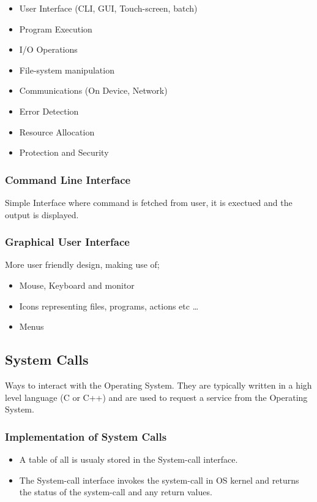 \documentclass[]{article}
\begin{document}
\begin{itemize}
    \item User Interface (CLI, GUI, Touch-screen, batch)
    \item Program Execution
    \item I/O Operations
    \item File-system manipulation
    \item Communications (On Device, Network)
    \item Error Detection
    \item Resource Allocation
    \item Protection and Security
\end{itemize}

\subsubsection*{Command Line Interface}

Simple Interface where command is fetched from user, it is exectued and the output is displayed.

\subsubsection*{Graphical User Interface}
More user friendly design, making use of;
\begin{itemize}
    \item Mouse, Keyboard and monitor
    \item Icons representing files, programs, actions etc \dots
    \item Menus
\end{itemize}

\subsection{System Calls}

Ways to interact with the Operating System. They are typically written in a high level language (C or C++) and are used to request a service from the Operating System.

\subsubsection*{Implementation of System Calls}

\begin{itemize}
    \item A table of all is usualy stored in the System-call interface.
    \item The System-call interface invokes the system-call in OS kernel and returns the status of the system-call and any return values.
\end{itemize}
\end{document}
